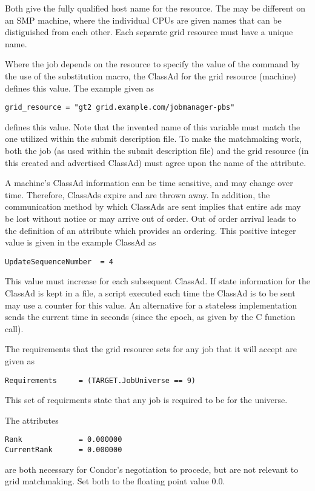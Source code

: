 Both give the fully qualified host name for the resource.
The  may be different on an SMP machine,
where the individual CPUs are given names that can
be distiguished from each other.
Each separate grid resource must have a unique name.

Where the job depends on the resource to specify the
value of the  command by
the use of the substitution macro,
the ClassAd for the grid resource (machine)
defines this value.
The example given as
\footnotesize
\begin{verbatim}
grid_resource = "gt2 grid.example.com/jobmanager-pbs"
\end{verbatim}
\normalsize
defines this value.
Note that the invented name of this variable must match the
one utilized within the submit description file.
To make the matchmaking work,
both the job (as used within the submit description file)
and the grid resource (in this created and advertised ClassAd)
must agree upon the name of the attribute.

A machine's ClassAd information can be time sensitive,
and may change over time.
Therefore, ClassAds expire and are thrown away.
In addition, the communication method by which ClassAds
are sent implies that entire ads may be lost without notice
or may arrive out of order.
Out of order arrival leads to the definition of an
attribute which provides an ordering.
This positive integer value is given in the example
ClassAd as
\footnotesize
\begin{verbatim}
UpdateSequenceNumber  = 4
\end{verbatim}
\normalsize
This value must increase for each subsequent ClassAd.
If state information for the ClassAd is kept in a file,
a script executed each time the ClassAd is to be sent
may use a counter for this value.
An alternative for a stateless implementation sends
the current time in seconds (since the epoch, as given by
the C  function call).

The requirements that the grid resource sets for any job
that it will accept are given as
\footnotesize
\begin{verbatim}
Requirements     = (TARGET.JobUniverse == 9)
\end{verbatim}
\normalsize
This set of requirments state that any job is
required to be for the  universe.

The attributes
\footnotesize
\begin{verbatim}
Rank             = 0.000000
CurrentRank      = 0.000000
\end{verbatim}
\normalsize
are both necessary for Condor's negotiation to procede,
but are not relevant to grid matchmaking.
Set both to the floating point value 0.0.


